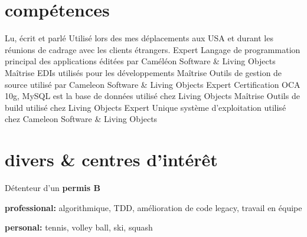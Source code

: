 \documentclass{friggeri-cv} 	%
\begin{document}
\section{compétences}

\begin{capabilitize}
		{Lu, écrit et parlé}
		{Utilisé lors des mes déplacements aux USA et durant les réunions de cadrage avec les clients
		étrangers.}
		{Expert}
		{Langage de programmation principal des applications éditées par Caméléon Software \& Living Objects}
		{Maîtrise}
		{EDIs utilisés pour les développements}
		{Maîtrise}
		{Outils de gestion de source utilisé par Cameleon Software \& Living Objects}
		{Expert}
		{Certification OCA 10g, MySQL est la base de données utilisé chez Living Objects}
		{Maîtrise}
		{Outils de build utilisé chez Living Objects}
		{Expert}
		{Unique système d'exploitation utilisé chez Cameleon Software \& Living Objects}
\end{capabilitize}


\section{divers \& centres d'intérêt}

Détenteur d'un \textbf{permis B}

\textbf{professional:} algorithmique, TDD, amélioration de code legacy, travail en équipe

\textbf{personal:} tennis, volley ball, ski, squash
\end{document}
